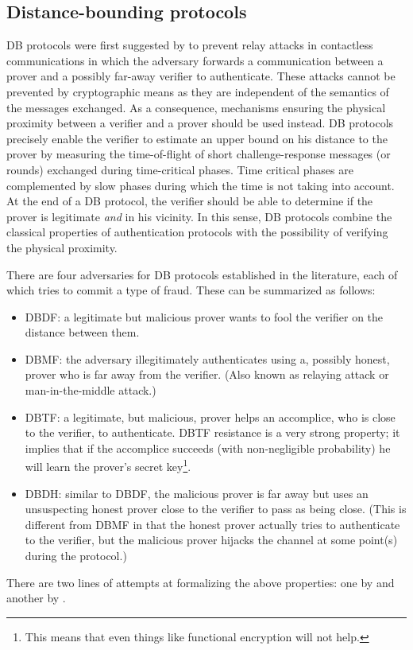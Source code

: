 \subsection{Distance-bounding protocols}%
\label{distance-bounding}

\Ac{DB} protocols were first suggested by \citet{DistanceBounding} to prevent relay attacks in contactless communications in which the adversary forwards a communication between a prover and a possibly far-away verifier to authenticate. 
These attacks cannot be prevented by cryptographic means as they are independent of the semantics of the messages exchanged.
As a consequence, mechanisms ensuring the physical proximity between a verifier and a prover should be used instead.
\Ac{DB} protocols precisely enable the verifier to estimate an upper bound on his distance to the prover by measuring the time-of-flight of short challenge-response messages (or rounds) exchanged during time-critical phases. 
Time critical phases are complemented by slow phases during which the time is not taking into account. 
At the end of a \Ac{DB} protocol, the verifier should be able to determine if the prover is legitimate \emph{and} in his vicinity.
In this sense, \Ac{DB} protocols combine the classical properties of authentication protocols with the possibility of verifying the physical proximity.

There are four adversaries for \ac{DB} protocols established in the literature, 
each of which tries to commit a type of fraud.
These can be summarized as follows:
\begin{itemize}
  \item \Acf{DBDF}: a legitimate but malicious prover wants to fool the verifier on the distance between them.
  \item \Acf{DBMF}: the adversary illegitimately authenticates using a, 
    possibly honest, prover who is far away from the verifier.
    (Also known as relaying attack or man-in-the-middle attack.)
  \item \Acf{DBTF}: a legitimate, but malicious, prover helps an accomplice, 
    who is close to the verifier, to authenticate.
    \Ac{DBTF} resistance is a very strong property; it implies that if the 
    accomplice succeeds (with non-negligible probability) he will learn the 
    prover's secret key\footnote{%
      This means that even things like functional encryption will not help.
    }.
  \item \Acf{DBDH}: similar to \ac{DBDF}, the malicious prover is far away but 
    uses an unsuspecting honest prover close to the verifier to pass as being 
    close.
    (This is different from \ac{DBMF} in that the honest prover actually tries 
    to authenticate to the verifier, but the malicious prover hijacks the 
    channel at some point(s) during the protocol.)
\end{itemize}
There are two lines of attempts at formalizing the above properties: one by \citet{DB-BMV} and another by \citet{DB-DFKO}.

